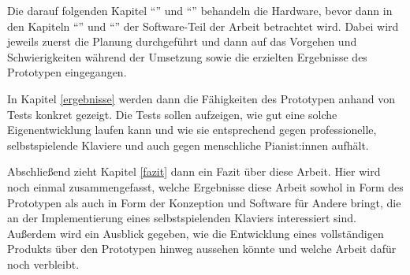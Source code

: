 Die darauf folgenden Kapitel \enquote{} und \enquote{} behandeln die Hardware, bevor dann in den Kapiteln \enquote{} und \enquote{} der Software-Teil der Arbeit betrachtet wird.
Dabei wird jeweils zuerst die Planung durchgeführt und dann auf das Vorgehen und Schwierigkeiten während der Umsetzung sowie die erzielten Ergebnisse des Prototypen eingegangen.

In Kapitel \ref{ergebnisse} werden dann die Fähigkeiten des Prototypen anhand von Tests konkret gezeigt.
Die Tests sollen aufzeigen, wie gut eine solche Eigenentwicklung laufen kann und wie sie entsprechend gegen professionelle, selbstspielende Klaviere und auch gegen menschliche Pianist:innen aufhält. %

Abschließend zieht Kapitel \ref{fazit} dann ein Fazit über diese Arbeit.
Hier wird noch einmal zusammengefasst, welche Ergebnisse diese Arbeit sowhol in Form des Prototypen als auch in Form der Konzeption und Software für Andere bringt, die an der Implementierung eines selbstspielenden Klaviers interessiert sind.
Außerdem wird ein Ausblick gegeben, wie die Entwicklung eines vollständigen Produkts über den Prototypen hinweg aussehen könnte und welche Arbeit dafür noch verbleibt.
